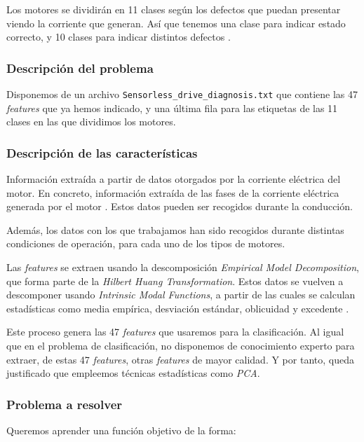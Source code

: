 \documentclass[11pt]{article}
\begin{document}
Los motores se dividirán en 11 clases según los defectos que puedan presentar viendo la corriente que generan. Así que tenemos una clase para indicar estado correcto, y 10 clases para indicar distintos defectos \cite{paper_clasificacion_1:paper}.

\subsubsection{Descripción del problema}

Disponemos de un archivo \lstinline{Sensorless_drive_diagnosis.txt} que contiene las 47 \emph{features} que ya hemos indicado, y una última fila para las etiquetas de las 11 clases en las que dividimos los motores.


\subsubsection{Descripción de las características}

Información extraída a partir de datos otorgados por la corriente eléctrica del motor. En concreto, información extraída de las fases de la corriente eléctrica generada por el motor \cite{paper_clasificacion_1:paper}. Estos datos pueden ser recogidos durante la conducción.

Además, los datos con los que trabajamos han sido recogidos durante distintas condiciones de operación, para cada uno de los tipos de motores.

Las \emph{features} se extraen usando la descomposición \emph{Empirical Model Decomposition}, que forma parte de la \emph{Hilbert Huang Transformation}. Estos datos se vuelven a descomponer usando \emph{Intrinsic Modal Functions}, a partir de las cuales se calculan estadísticas como media empírica, desviación estándar, oblicuidad y excedente \cite{paper_clasificacion_1:paper}.

Este proceso genera las 47 \emph{features} que usaremos para la clasificación. Al igual que en el problema de clasificación, no disponemos de conocimiento experto para extraer, de estas 47 \emph{features}, otras \emph{features} de mayor calidad. Y por tanto, queda justificado que empleemos técnicas estadísticas como \emph{PCA}.

\subsubsection{Problema a resolver}

Queremos aprender una función objetivo de la forma:
\end{document}
